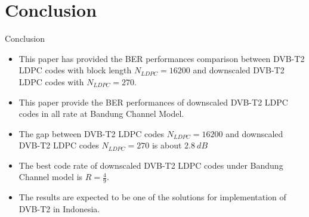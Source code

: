 \documentclass[11pt, aspectratio=169]{beamer}
\begin{document}





\section{Conclusion}
\begin{frame}{Conclusion}
\begin{itemize}
\justifying
\item This paper has provided the BER performances comparison between DVB-T2 LDPC codes with block length $N_{LDPC}=16200$ and downscaled DVB-T2 LDPC codes with $N_{LDPC}=270$. 
\item This paper provide the BER performances of downscaled DVB-T2 LDPC codes in all rate at Bandung Channel Model.
\item The gap between DVB-T2 LDPC codes  $N_{LDPC}=16200$ and downscaled DVB-T2 LDPC codes $N_{LDPC}=270$ is about $2.8~dB$
\item The best code rate of downscaled DVB-T2 LDPC codes under Bandung Channel model is $R=\frac{4}{9}$.
\item The results are expected to be one of the solutions for implementation of DVB-T2 in Indonesia. 
\end{itemize}
\end{frame}
\end{document}
